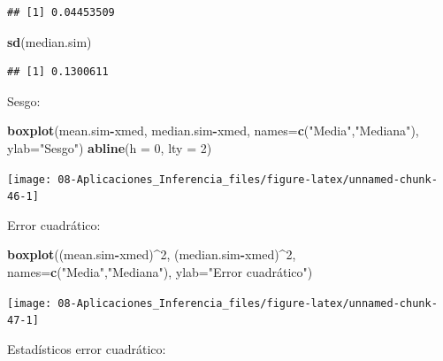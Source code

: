 \documentclass[
]{book}
\newenvironment{Shaded}{\begin{snugshade}}{\end{snugshade}}
\newcommand{\DataTypeTok}[1]{\textcolor[rgb]{0.13,0.29,0.53}{#1}}
\newcommand{\DecValTok}[1]{\textcolor[rgb]{0.00,0.00,0.81}{#1}}
\newcommand{\KeywordTok}[1]{\textcolor[rgb]{0.13,0.29,0.53}{\textbf{#1}}}
\newcommand{\NormalTok}[1]{#1}
\newcommand{\OperatorTok}[1]{\textcolor[rgb]{0.81,0.36,0.00}{\textbf{#1}}}
\newcommand{\StringTok}[1]{\textcolor[rgb]{0.31,0.60,0.02}{#1}}
\theoremstyle{break}
\theoremstyle{definition}
\theoremstyle{definition}
\theoremstyle{definition}
\theoremstyle{remark}
\begin{document}
\begin{enumerate}
\begin{verbatim}
## [1] 0.04453509
\end{verbatim}

\begin{Shaded}
\begin{Highlighting}[]
\KeywordTok{sd}\NormalTok{(median.sim)}
\end{Highlighting}
\end{Shaded}

\begin{verbatim}
## [1] 0.1300611
\end{verbatim}

  Sesgo:

\begin{Shaded}
\begin{Highlighting}[]
\KeywordTok{boxplot}\NormalTok{(mean.sim}\OperatorTok{-}\NormalTok{xmed, median.sim}\OperatorTok{-}\NormalTok{xmed, }
      \DataTypeTok{names=}\KeywordTok{c}\NormalTok{(}\StringTok{"Media"}\NormalTok{,}\StringTok{"Mediana"}\NormalTok{), }\DataTypeTok{ylab=}\StringTok{"Sesgo"}\NormalTok{)}
\KeywordTok{abline}\NormalTok{(}\DataTypeTok{h =} \DecValTok{0}\NormalTok{, }\DataTypeTok{lty =} \DecValTok{2}\NormalTok{)}
\end{Highlighting}
\end{Shaded}

  \begin{center}\texttt{[image: 08-Aplicaciones\_Inferencia\_files/figure-latex/unnamed-chunk-46-1]} \end{center}

  Error cuadrático:

\begin{Shaded}
\begin{Highlighting}[]
\KeywordTok{boxplot}\NormalTok{((mean.sim}\OperatorTok{-}\NormalTok{xmed)}\OperatorTok{^}\DecValTok{2}\NormalTok{, (median.sim}\OperatorTok{-}\NormalTok{xmed)}\OperatorTok{^}\DecValTok{2}\NormalTok{, }
      \DataTypeTok{names=}\KeywordTok{c}\NormalTok{(}\StringTok{"Media"}\NormalTok{,}\StringTok{"Mediana"}\NormalTok{), }\DataTypeTok{ylab=}\StringTok{"Error cuadrático"}\NormalTok{)}
\end{Highlighting}
\end{Shaded}

  \begin{center}\texttt{[image: 08-Aplicaciones\_Inferencia\_files/figure-latex/unnamed-chunk-47-1]} \end{center}

  Estadísticos error cuadrático:


\end{enumerate}
\end{document}
